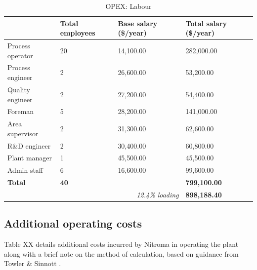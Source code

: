 \begin{table}[H]
\centering
\caption{OPEX: Labour}
\label{tab:opex-labour}
\begin{tabular}{llll}
\toprule
\textbf{}        & \textbf{Total employees} & \textbf{Base salary (\$/year)}              & \textbf{Total salary (\$/year)} \\\midrule
Process operator & 20                       & 14,100.00                                   & 282,000.00                      \\
Process engineer & 2                        & 26,600.00                                   & 53,200.00                       \\
Quality engineer & 2                        & 27,200.00                                   & 54,400.00                       \\
Foreman          & 5                        & 28,200.00                                   & 141,000.00                      \\
Area supervisor  & 2                        & 31,300.00                                   & 62,600.00                       \\
R\&D engineer    & 2                        & 30,400.00                                   & 60,800.00                       \\
Plant manager    & 1                        & 45,500.00                                   & 45,500.00                       \\
Admin staff      & 6                        & 16,600.00                                   & 99,600.00                       \\
\textbf{Total}   & \textbf{40}              & \textbf{}                                   & \textbf{799,100.00}             \\
                 &                          & \multicolumn{1}{r}{\textit{12.4\% loading}} & \textbf{898,188.40} \\\bottomrule           
\end{tabular}
\end{table}

\subsection{Additional operating costs}
Table XX details additional costs incurred by Nitroma in operating the plant along with a brief note on the method of calculation, based on guidance from Towler \& Sinnott \cite{sinnott_chemical_2020}.

